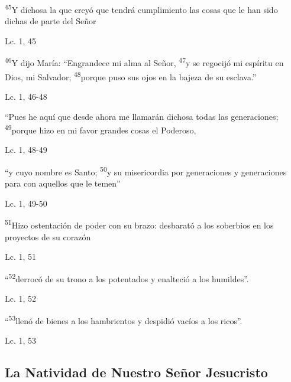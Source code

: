 \documentclass[a4paper,11pt]{article}
\begin{document}
      \textsuperscript{45}Y dichosa la que creyó que tendrá cumplimiento las cosas que le han sido dichas de parte del Señor
      \begin{flushright}
        Lc. 1, 45         
      \end{flushright}
      \medskip
      
      \textsuperscript{46}Y dijo María: ``Engrandece mi alma al Señor, \textsuperscript{47}y se regocijó mi espíritu en Dios, mi Salvador;
      \textsuperscript{48}porque puso sus ojos en la bajeza de su esclava.''
      \begin{flushright}
        Lc. 1, 46-48        
      \end{flushright}
      \medskip

      ``Pues he aquí que desde ahora me llamarán dichosa todas las generaciones; \textsuperscript{49}porque hizo en mi favor grandes cosas el Poderoso,
      \begin{flushright}
        Lc. 1, 48-49          
      \end{flushright}
      \medskip
      
      ``y cuyo nombre es Santo; \textsuperscript{50}y su misericordia por generaciones y generaciones para con aquellos que le temen''
      \begin{flushright}
        Lc. 1, 49-50          
      \end{flushright}
      \medskip
      
      \textsuperscript{51}Hizo ostentación de poder con su brazo: desbarató a los soberbios en los proyectos de su corazón
      \begin{flushright}
        Lc. 1, 51        
      \end{flushright}
      \medskip
      
      ``\textsuperscript{52}derrocó de su trono a los potentados y enalteció a los humildes''.
      \begin{flushright}
        Lc. 1, 52       
      \end{flushright}
      \medskip
      
      ``\textsuperscript{53}llenó de bienes a los hambrientos y despidió vacíos a los ricos''.
      \begin{flushright}
        Lc. 1, 53
      \end{flushright}
      \medskip
            
    \subsection*{\hfil La Natividad de Nuestro Señor Jesucristo \hfil}
      
\end{document}
